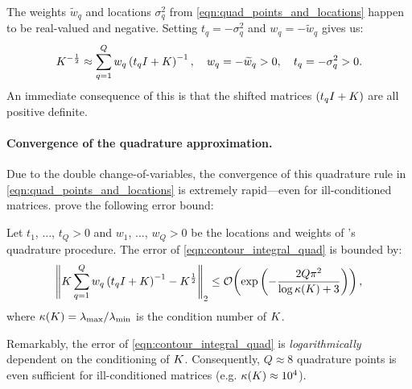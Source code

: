 %
The weights $\widetilde w_q$ and locations $\sigma_q^2$ from \cref{eqn:quad_points_and_locations} happen to be real-valued and negative.
Setting $t_q = -\sigma_q^2$ and $w_q = -\widetilde w_q$ gives us:
%
\begin{equation}
	K^{-\frac 1 2} \approx \sum_{q=1}^Q w_q \left( t_q I + K \right)^{-1}, \quad w_q = -\widetilde w_q > 0, \quad t_q = -\sigma_q^2 > 0.
  \label{eqn:contour_integral_quad_4}
\end{equation}
%
An immediate consequence of this is that the shifted matrices $(t_q I + K)$ are all positive definite.

\paragraph{Convergence of the quadrature approximation.}
Due to the double change-of-variables, the convergence of this quadrature rule in \cref{eqn:quad_points_and_locations} is extremely rapid---even for ill-conditioned matrices.
\citeauthor{hale2008computing} prove the following error bound:
%
\begin{lemma}
  Let $t_1$, $\ldots$, $t_Q > 0$ and $w_1$, $\ldots$, $w_Q > 0$ be the locations and weights of \citeauthor{hale2008computing}'s quadrature procedure.
  The error of \cref{eqn:contour_integral_quad} is bounded by:
  \[
    \left\Vert \bK \sum_{q=1}^Q w_q \left( t_q \bI + \bK \right)^{-1} - \bK^{\frac 1 2} \right\Vert_2
    \leq \bigo{\exp\left( -\frac  {2 Q \pi^2}{\log \kappa(\bK) + 3} \right)},
  \]
  where $\kappa(K) = \lambda_\text{max} / \lambda_\text{min}$ is the condition number of $K$.
\label{lemma:hale}
\end{lemma}
%
\noindent
Remarkably, the error of \cref{eqn:contour_integral_quad} is \emph{logarithmically} dependent on the conditioning of $K$.
Consequently, $Q\approx8$ quadrature points is even sufficient for ill-conditioned matrices (e.g. $\kappa(K) \approx 10^4$).

